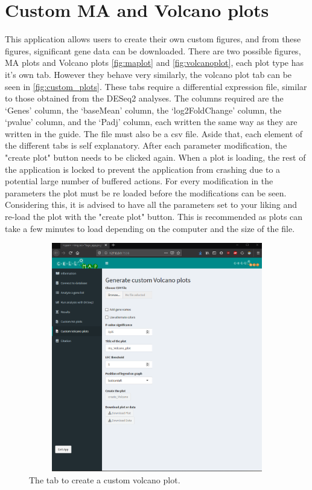 \documentclass[11pt]{article}
\begin{document}
\section{Custom MA and Volcano plots \label{custom_plots}}
This application allows users to create their own custom figures, and from these figures, significant gene data can be downloaded. There are two possible figures, MA plots and Volcano plots \autoref{fig:maplot} and \autoref{fig:volcanoplot}, each plot type has it's own tab. However they behave very similarly, the volcano plot tab can be seen in \autoref{fig:custom_plots}. 
These tabs require a differential expression file, similar to those obtained from the \acrshort{DESeq2} analyses. The columns required are the `Genes' column, the `baseMean' column, the `log2FoldChange' column, the `pvalue' column, and the `\acrshort{Padj}' column, each written the same way as they are written in the guide. The file must also be a \acrshort{csv} file.
Aside that, each element of the different tabs is self explanatory. After each parameter modification, the "create plot" button needs to be clicked again. When a plot is loading, the rest of the application is locked to prevent the application from crashing due to a potential large number of buffered actions. For every modification in the parameters the plot must be re loaded before the modifications can be seen. Considering this, it is advised to have all the parameters set to your liking and re-load the plot with the "create plot" button. This is recommended as plots can take a few minutes to load depending on the computer and the size of the file.

\begin{figure}[h!]
\centering
\includegraphics[width=15cm,height=10cm,keepaspectratio]{custom_volcano_tab.png}
\caption{The tab to create a custom volcano plot.}
\label{fig:custom_plots}
\end{figure}
\end{document}
